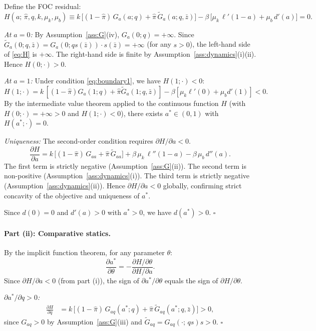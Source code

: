 \documentclass[12pt]{article}
\newcommand{\hpi}{\hat{\pi}}
\begin{document}
Define the FOC residual:
\begin{equation}
H(a;\, \hpi, q, k, \mu_k, \mu_b) \equiv
k\,\bigl[(1-\hpi)\,G_a(a;q) + \hpi\,\tilde{G}_a(a;q,\bar{z})\bigr]
- \beta\,\bigl[\mu_k\,\ell'(1-a) + \mu_b\,d'(a)\bigr] = 0.
\label{eq:H}
\end{equation}

\textit{At $a = 0$:} By Assumption~\ref{ass:G}(iv), $G_a(0; q) = +\infty$.
Since $\tilde{G}_a(0;q,\bar{z}) = G_a(0; q s(\bar{z})) \cdot s(\bar{z}) = +\infty$
(for any $s > 0$), the left-hand side of \eqref{eq:H} is $+\infty$.
The right-hand side is finite by Assumption~\ref{ass:dynamics}(i)(ii).
Hence $H(0; \cdot) > 0$.

\textit{At $a = 1$:} Under condition \eqref{eq:boundary1}, we have $H(1;\cdot) < 0$:
\[
H(1;\cdot) = k\,[(1-\hpi)G_a(1;q)+\hpi\tilde G_a(1;q,\bar z)] - \beta[\mu_k\ell'(0)+\mu_b d'(1)] < 0.
\]
By the intermediate value theorem applied to the continuous function $H$
(with $H(0;\cdot) = +\infty > 0$ and $H(1;\cdot) < 0$), there exists
$a^* \in (0,1)$ with $H(a^*;\cdot) = 0$.

\textit{Uniqueness:} The second-order condition requires $\partial H / \partial a < 0$.
\begin{equation}
\frac{\partial H}{\partial a} = k\,\bigl[(1-\hpi)\,G_{aa} + \hpi\,\tilde{G}_{aa}\bigr]
+ \beta\,\mu_k\,\ell''(1-a) - \beta\,\mu_b\,d''(a).
\label{eq:SOC}
\end{equation}
The first term is strictly negative (Assumption~\ref{ass:G}(ii)).
The second term is non-positive (Assumption~\ref{ass:dynamics}(i)).
The third term is strictly negative (Assumption~\ref{ass:dynamics}(ii)).
Hence $\partial H / \partial a < 0$ globally, confirming strict concavity of the
objective and uniqueness of $a^*$.

Since $d(0) = 0$ and $d'(a) > 0$ with $a^* > 0$, we have $d(a^*) > 0$. $\square$

\paragraph{Part (ii): Comparative statics.}

By the implicit function theorem, for any parameter $\theta$:
\[
\frac{\partial a^*}{\partial \theta} = - \frac{\partial H / \partial \theta}{\partial H / \partial a}.
\]
Since $\partial H / \partial a < 0$ (from part (i)), the sign of
$\partial a^* / \partial \theta$ equals the sign of $\partial H / \partial \theta$.

\textit{$\partial a^* / \partial q > 0$:}
\begin{align}
\frac{\partial H}{\partial q} &= k\,\bigl[(1-\hpi)\,G_{aq}(a^*;q) + \hpi\,\tilde{G}_{aq}(a^*;q,\bar{z})\bigr] > 0,
\end{align}
since $G_{aq} > 0$ by Assumption~\ref{ass:G}(iii) and
$\tilde{G}_{aq} = G_{aq}(\cdot;\, qs)s > 0$. $\square$
\end{document}
